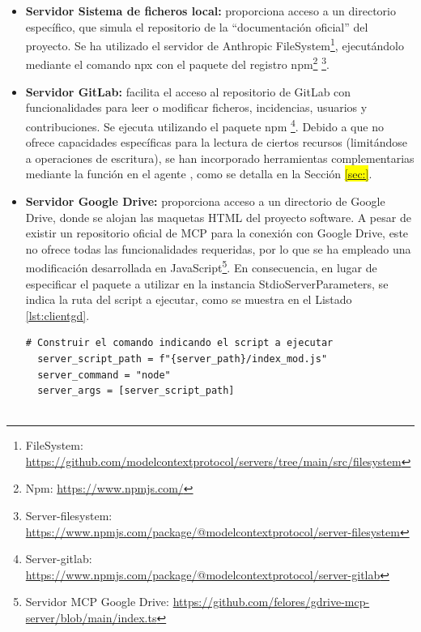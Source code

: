 \begin{itemize}
  \item\textbf{Servidor Sistema de ficheros local: }proporciona acceso a un directorio específico, que simula el repositorio de la ``documentación oficial'' del proyecto. Se ha utilizado el servidor de Anthropic FileSystem\footnote{FileSystem: \url{https://github.com/modelcontextprotocol/servers/tree/main/src/filesystem}}, ejecutándolo mediante el comando npx con el paquete del registro npm\footnote{Npm: \url{https://www.npmjs.com/}} \footnote{Server-filesystem: \url{https://www.npmjs.com/package/@modelcontextprotocol/server-filesystem}}.

  \item\textbf{Servidor GitLab: }facilita el acceso al repositorio de GitLab con funcionalidades para leer o modificar ficheros, incidencias, usuarios y contribuciones. Se ejecuta utilizando el paquete npm \footnote{Server-gitlab: \url{https://www.npmjs.com/package/@modelcontextprotocol/server-gitlab}}. Debido a que no ofrece capacidades específicas para la lectura de ciertos recursos (limitándose a operaciones de escritura), se han incorporado herramientas complementarias mediante la función  en el agente , como se detalla en la Sección \colorbox{yellow}{\ref{sec:}}.

  \item\textbf{Servidor Google Drive: }proporciona acceso a un directorio de Google Drive, donde se alojan las maquetas HTML del proyecto software. A pesar de existir un repositorio oficial de MCP para la conexión con Google Drive, este no ofrece todas las funcionalidades requeridas, por lo que se ha empleado una modificación desarrollada en JavaScript\footnote{Servidor MCP Google Drive: \url{https://github.com/felores/gdrive-mcp-server/blob/main/index.ts}}. En consecuencia, en lugar de especificar el paquete a utilizar en la instancia StdioServerParameters, se indica la ruta del script a ejecutar, como se muestra en el Listado \ref{lst:clientgd}.

    \begin{lstlisting}[caption={\protect\opus{mcp_multi_client.py}: StdioServerParameters para el servidor MCP de Google Drive},label={lst:clientgd}]
  # Construir el comando indicando el script a ejecutar
  server_script_path = f"{server_path}/index_mod.js"
  server_command = "node"
  server_args = [server_script_path]


\end{lstlisting}
\end{itemize}
